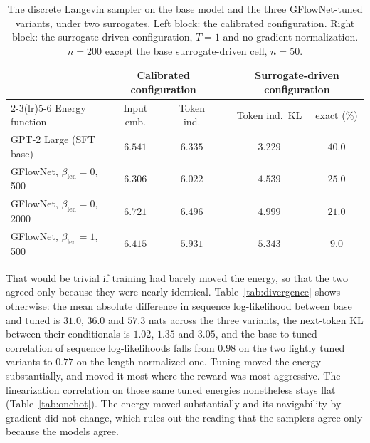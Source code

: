 \begin{table}[htbp]
    \centering
    \small
    \setlength{\tabcolsep}{5pt}
    \begin{tabular}{lccccc}
        \toprule
        & \multicolumn{2}{c}{Calibrated configuration} & & \multicolumn{2}{c}{Surrogate-driven configuration} \\
        \cmidrule(lr){2-3}\cmidrule(lr){5-6}
        Energy function & Input emb. & Token ind. & & Token ind.\ KL & exact (\%) \\
        \midrule
        GPT-2 Large (SFT base) & $6.541$ & $6.335$ & & $3.229$ & $40.0$ \\
        GFlowNet, $\beta_{\text{len}} = 0$, 500 & $6.306$ & $6.022$ & & $4.539$ & $25.0$ \\
        GFlowNet, $\beta_{\text{len}} = 0$, 2000 & $6.721$ & $6.496$ & & $4.999$ & $21.0$ \\
        GFlowNet, $\beta_{\text{len}} = 1$, 500 & $6.415$ & $5.931$ & & $5.343$ & $9.0$ \\
        \bottomrule
    \end{tabular}
    \caption[Final KL and recovery on the base model and the three GFlowNet variants.]{The discrete Langevin sampler on the base model and the three GFlowNet-tuned variants, under two surrogates. Left block: the calibrated configuration. Right block: the surrogate-driven configuration, $T = 1$ and no gradient normalization. $n = 200$ except the base surrogate-driven cell, $n = 50$.}
    \label{tab:gfn-unify}
\end{table}

That would be trivial if training had barely moved the energy, so that the two agreed only because they were nearly identical. Table~\ref{tab:divergence} shows otherwise: the mean absolute difference in sequence log-likelihood between base and tuned is $31.0$, $36.0$ and $57.3$ nats across the three variants, the next-token KL between their conditionals is $1.02$, $1.35$ and $3.05$, and the base-to-tuned correlation of sequence log-likelihoods falls from $0.98$ on the two lightly tuned variants to $0.77$ on the length-normalized one. Tuning moved the energy substantially, and moved it most where the reward was most aggressive.
The linearization correlation on those same tuned energies nonetheless stays flat (Table~\ref{tab:onehot}). The energy moved substantially and its navigability by gradient did not change, which rules out the reading that the samplers agree only because the models agree.

